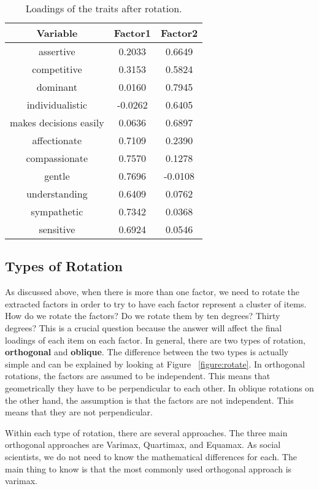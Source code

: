\documentclass[a4paper,12pt,oneside]{book}
\begin{document}
\begin{table}[h!t]
	\caption{Loadings of the traits after rotation.} \label{table:rotatefactormasculinefeminine}
	\centering
	\begin{tabular}{c c c}
	\hline
	{Variable} & {Factor1} & {Factor2} \\
	\hline
	assertive & 0.2033 & 0.6649\\
	competitive & 0.3153 &  0.5824\\
	dominant & 0.0160 &  0.7945\\
	individualistic & -0.0262 & 0.6405 \\
	makes decisions easily & 0.0636 & 0.6897 \\
	affectionate & 0.7109 & 0.2390 \\
	compassionate & 0.7570 & 0.1278 \\
	gentle & 0.7696 & -0.0108 \\
	understanding &  0.6409 & 0.0762 \\
	sympathetic & 0.7342 & 0.0368 \\
	sensitive & 0.6924 & 0.0546 \\
	\hline
	\end{tabular}
\end{table}

\subsection{Types of Rotation}

As discussed above, when there is more than one factor, we need to rotate the extracted factors in order to try to have each factor represent a 
cluster of items. How do we rotate the factors? Do we rotate them by ten degrees? Thirty degrees? This is a crucial question because the answer
will affect the final loadings of each item on each factor. In general, there are two types of rotation, \textbf{orthogonal} and \textbf{oblique}. 
The difference between the two types is actually simple and can be explained by looking at Figure ~\ref{figure:rotate}. In
orthogonal rotations, the factors are assumed to be independent. This means that geometrically they have to be perpendicular to each other. In
oblique rotations on the other hand, the assumption is that the factors are not independent. This means that they are not perpendicular. 

Within each type of rotation, there are several approaches. The three main orthogonal approaches are Varimax, Quartimax, and Equamax.  
As social scientists, we do not need to know the mathematical differences for each. The main thing to know is that the most commonly used 
orthogonal approach is varimax. 
\end{document}
